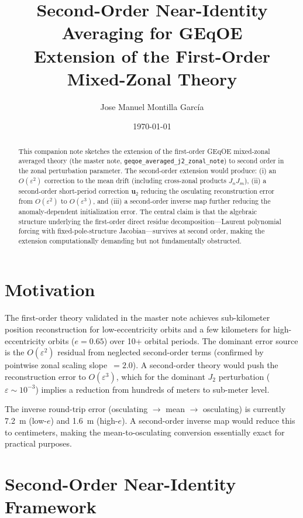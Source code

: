 \documentclass[11pt]{article}
\title{Second-Order Near-Identity Averaging for GEqOE\\
\large Extension of the First-Order Mixed-Zonal Theory}
\author{Jose Manuel Montilla Garc\'ia}
\date{\today}
\newcommand{\eps}{\varepsilon}
\newcommand{\master}{geqoe\_averaged\_j2\_zonal\_note}
\begin{document}
\maketitle

\begin{abstract}
This companion note sketches the extension of the first-order GEqOE
mixed-zonal averaged theory (the master note, \texttt{\master{}}) to second
order in the zonal perturbation parameter. The second-order extension would
produce: (i) an $O(\eps^2)$ correction to the mean drift (including
cross-zonal products $J_n J_m$), (ii) a second-order short-period correction
$\bm u_2$ reducing the osculating reconstruction error from $O(\eps^2)$ to
$O(\eps^3)$, and (iii) a second-order inverse map further reducing the
anomaly-dependent initialization error. The central claim is that the
algebraic structure underlying the first-order direct residue
decomposition---Laurent polynomial forcing with fixed-pole-structure
Jacobian---survives at second order, making the extension computationally
demanding but not fundamentally obstructed.
\end{abstract}

\tableofcontents

\section{Motivation}

The first-order theory validated in the master note achieves sub-kilometer
position reconstruction for low-eccentricity orbits and a few kilometers for
high-eccentricity orbits ($e = 0.65$) over 10+ orbital periods. The dominant
error source is the $O(\eps^2)$ residual from neglected second-order terms
(confirmed by pointwise zonal scaling slope~$= 2.0$). A second-order theory
would push the reconstruction error to $O(\eps^3)$, which for the dominant $J_2$ perturbation
($\eps \sim 10^{-3}$) implies a reduction from hundreds of meters to
sub-meter level.

The inverse round-trip error (osculating $\to$ mean $\to$ osculating) is
currently 7.2~m (low-$e$) and 1.6~m (high-$e$). A second-order inverse map
would reduce this to centimeters, making the mean-to-osculating conversion
essentially exact for practical purposes.

\section{Second-Order Near-Identity Framework}
\end{document}
